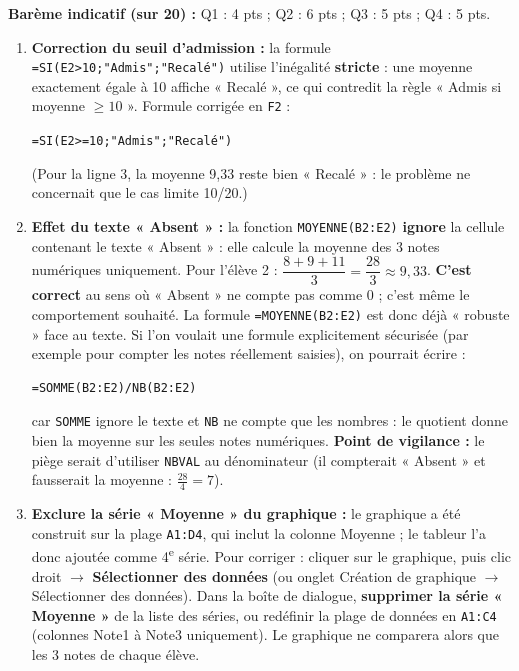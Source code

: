 \documentclass[11pt]{article}
\begin{document}
\begin{corrige}
\textbf{Barème indicatif (sur 20) :} Q1 : 4 pts ; Q2 : 6 pts ; Q3 : 5 pts ; Q4 : 5 pts.

\begin{enumerate}
    \item \textbf{Correction du seuil d'admission :} la formule \texttt{=SI(E2>10;"Admis";"Recalé")} utilise l'inégalité \textbf{stricte} : une moyenne exactement égale à 10 affiche « Recalé », ce qui contredit la règle « Admis si moyenne $\ge 10$ ». Formule corrigée en \texttt{F2} :
    \begin{center}\texttt{=SI(E2>=10;"Admis";"Recalé")}\end{center}
    (Pour la ligne 3, la moyenne 9,33 reste bien « Recalé » : le problème ne concernait que le cas limite 10/20.)
    \item \textbf{Effet du texte « Absent » :} la fonction \texttt{MOYENNE(B2:E2)} \textbf{ignore} la cellule contenant le texte « Absent » : elle calcule la moyenne des 3 notes numériques uniquement. Pour l'élève 2 : $\dfrac{8+9+11}{3} = \dfrac{28}{3} \approx 9,33$. \textbf{C'est correct} au sens où « Absent » ne compte pas comme 0 ; c'est même le comportement souhaité. La formule \texttt{=MOYENNE(B2:E2)} est donc déjà « robuste » face au texte. Si l'on voulait une formule explicitement sécurisée (par exemple pour compter les notes réellement saisies), on pourrait écrire :
\begin{lstlisting}
=SOMME(B2:E2)/NB(B2:E2)
\end{lstlisting}
    car \texttt{SOMME} ignore le texte et \texttt{NB} ne compte que les nombres : le quotient donne bien la moyenne sur les seules notes numériques. \textbf{Point de vigilance :} le piège serait d'utiliser \texttt{NBVAL} au dénominateur (il compterait « Absent » et fausserait la moyenne : $\frac{28}{4} = 7$).
    \item \textbf{Exclure la série « Moyenne » du graphique :} le graphique a été construit sur la plage \texttt{A1:D4}, qui inclut la colonne Moyenne ; le tableur l'a donc ajoutée comme 4\textsuperscript{e} série. Pour corriger : cliquer sur le graphique, puis clic droit $\rightarrow$ \textbf{Sélectionner des données} (ou onglet Création de graphique $\rightarrow$ Sélectionner des données). Dans la boîte de dialogue, \textbf{supprimer la série « Moyenne »} de la liste des séries, ou redéfinir la plage de données en \texttt{A1:C4} (colonnes Note1 à Note3 uniquement). Le graphique ne comparera alors que les 3 notes de chaque élève.

\end{enumerate}
\end{corrige}
\end{document}
